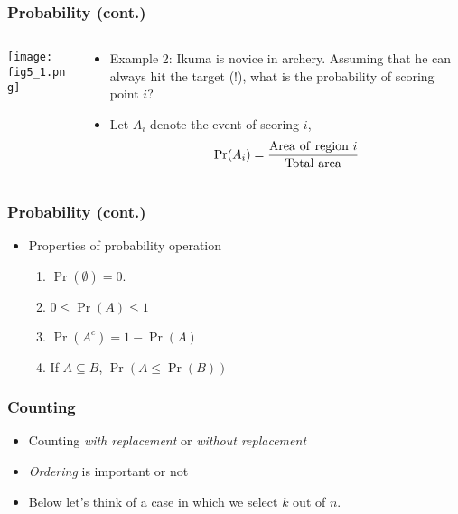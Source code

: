 \documentclass[pdflatex, 12pt]{beamer}
\begin{document}
\begin{frame}
\frametitle{Probability (cont.)}
\begin{columns}
\begin{column}{0.5\textwidth}
\centering
\texttt{[image: fig5\_1.png]}
\end{column}
\begin{column}{0.5\textwidth}
\begin{itemize}
\item Example 2: Ikuma is novice in archery. Assuming that he can always hit the target (!), what is the probability of scoring point $i$?
\vspace{0.4cm}
\item Let $A_i$ denote the event of scoring $i$, 
 \begin{equation}
 \Pr(A_i) = \frac{\mathrm{Area \ of \ region\ }i}{\mathrm{Total \ area}} \notag
 \end{equation}
\end{itemize}
\end{column}
\end{columns}
\end{frame}

\begin{frame}
\frametitle{Probability (cont.)}
\begin{itemize}
\item Properties of probability operation
 \begin{enumerate}
 \item $\Pr(\emptyset) = 0.$
 \item $0 \leq \Pr(A) \leq 1$
 \item $\Pr(A^c) = 1 - \Pr(A)$
 \item If $A \subseteq B$, $\Pr(A \leq \Pr(B))$
 \end{enumerate}
\end{itemize}
\end{frame}

\begin{frame}
\frametitle{Counting}
\begin{itemize}
\item Counting \textit{with replacement} or \textit{without replacement}
\vspace{0.4cm}
\item \textit{Ordering} is important or not
\vspace{0.4cm}
\item Below let's think of a case in which we select $k$ out of $n$.
\end{itemize}
\end{frame}
\end{document}
